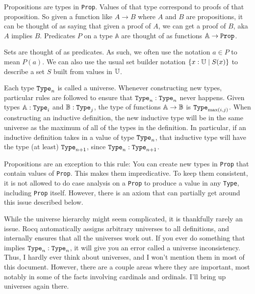 \documentclass[../../math.tex]{subfiles}
\begin{document}
Propositions are types in \verb|Prop|.  Values of that type correspond to proofs
of that proposition.  So given a function like $A \rightarrow B$ where $A$ and
$B$ are propositions, it can be thought of as saying that given a proof of $A$,
we can get a proof of $B$, aka $A$ implies $B$.  Predicates $P$ on a type
$\mathbb A$ are thought of as functions $\mathbb A \rightarrow \vtt{Prop}$.

Sets are thought of as predicates.  As such, we often use the notation $a \in P$
to mean $P(a)$.  We can also use the usual set builder notation $\{x : \mathbb{U} \mid
S(x)\}$ to describe a set $S$ built from values in $\mathbb{U}$.

Each type $\verb|Type|_n$ is called a universe.  Whenever constructing new
types, particular rules are followed to ensure that $\verb|Type|_n :
\verb|Type|_n$ never happens.  Given types $\A : \verb|Type|_{i}$ and $\B :
\verb|Type|_{j}$, the type of functions $\mathbb{A} \to \mathbb{B}$ is $\verb|Type|_{\max(i,
j)}$.  When constructing an inductive definition, the new inductive type will be
in the same universe as the maximum of all of the types in the definition.  In
particular, if an inductive definition takes in a value of type $\verb|Type|_n$,
that inductive type will have the type (at least) $\verb|Type|_{n + 1}$, since
$\verb|Type|_n : \verb|Type|_{n + 1}$.

Propositions are an exception to this rule: You can create new types in
\verb|Prop| that contain values of \verb|Prop|.  This makes them impredicative.
To keep them consistent, it is not allowed to do case analysis on a \verb|Prop|
to produce a value in any \verb|Type|, including \verb|Prop| itself.  However,
there is an axiom that can partially get around this issue described below.

While the universe hierarchy might seem complicated, it is thankfully rarely an
issue.  Rocq automatically assigns arbitrary universes to all definitions, and
internally ensures that all the universes work out.  If you ever do something
that implies $\verb|Type|_n : \verb|Type|_n$, it will give you an error called a
universe inconsistency.  Thus, I hardly ever think about universes, and I won't
mention them in most of this document.  However, there are a couple areas where
they are important, most notably in some of the facts involving cardinals and
ordinals.  I'll bring up universes again there.
\end{document}
